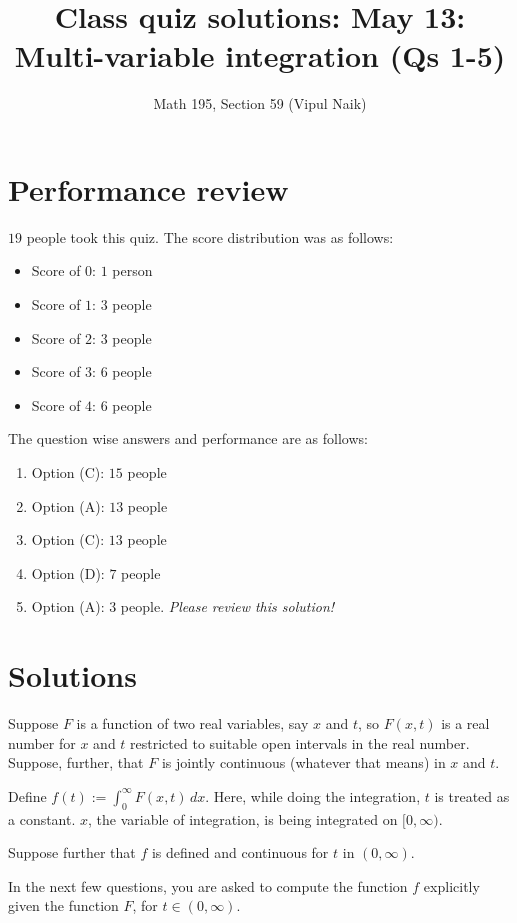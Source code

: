 \documentclass[10pt]{amsart}
\title{Class quiz solutions: May 13: Multi-variable integration (Qs 1-5)}
\author{Math 195, Section 59 (Vipul Naik)}
\begin{document}
\maketitle

\section{Performance review}

$19$ people took this quiz. The score distribution was as follows:

\begin{itemize}
\item Score of $0$: $1$ person
\item Score of $1$: $3$ people
\item Score of $2$: $3$ people
\item Score of $3$: $6$ people
\item Score of $4$: $6$ people
\end{itemize}

The question wise answers and performance are as follows:

\begin{enumerate}
\item Option (C): $15$ people
\item Option (A): $13$ people
\item Option (C): $13$ people
\item Option (D): $7$ people
\item Option (A): $3$ people. {\em Please review this solution!}
\end{enumerate}

\section{Solutions}

Suppose $F$ is a function of two real variables, say $x$
and $t$, so $F(x,t)$ is a real number for $x$ and $t$ restricted to
suitable open intervals in the real number. Suppose, further, that $F$
is jointly continuous (whatever that means) in $x$ and $t$.

Define $f(t) := \int_0^\infty F(x,t) \, dx$. Here, while doing the
integration, $t$ is treated as a constant. $x$, the variable of
integration, is being integrated on $[0,\infty)$.
  
Suppose further that $f$ is defined and continuous for $t$ in
$(0,\infty)$.

In the next few questions, you are asked to compute the function $f$
explicitly given the function $F$, for $t \in (0,\infty)$.
\end{document}
